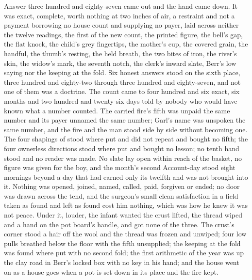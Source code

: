Answer three hundred and eighty-seven came out and the hand came down. It was exact, complete, worth nothing at two inches of air, a restraint and not a payment borrowing no house count and supplying no payer, laid across neither the twelve readings, the first of the new count, the printed figure, the bell's gap, the flat knock, the child's grey fingertips, the mother's cup, the covered grain, the handful, the thumb's resting, the held breath, the two bites of iron, the river's skin, the widow's mark, the seventh notch, the clerk's inward slate, Berr's low saying nor the keeping at the fold. Six honest answers stood on the sixth place, three hundred and eighty-two through three hundred and eighty-seven, and not one of them was a doctrine. The count came to four hundred and six exact, six months and two hundred and twenty-six days told by nobody who would have known what a number counted. The carried fire's fifth was unpaid the same number and its payer unnamed the same number; Garl's name was unspoken the same number, and the fire and the man stood side by side without becoming one. The four shapings of  stood where put and did not repeat and bought no fifth; the four ownerless directions stood where put and bought no lesson; no tenth hand stood and no reader was made. No slate lay open within reach of the basket, no figure was given for the boy, and the month's second Account-day stood eight mornings beyond a day that had earned only its twelfth and was not brought into it. Nothing was opened, joined, named, called, paid, forgiven or ended; no door was drawn across the tend, and the surgeon's small clean satisfaction in a field taken as found and left as found cost him nothing, which was how he knew it was not peace. Under it, louder, the infant wanted the crust lifted, the thread wiped and a hand on the pot board's handle, and got none of the three. The crust's corner stood a hair off the wool and the thread was frozen and unwiped; four low pulls breathed below the floor with the fifth unsupplied; the keeping at the fold was found where put with no second fold; the first arithmetic of the year was up the clay road in Berr's locked box with no key in his hand; and the house went on as a house goes when a pot is set down in its place and the fire kept.
